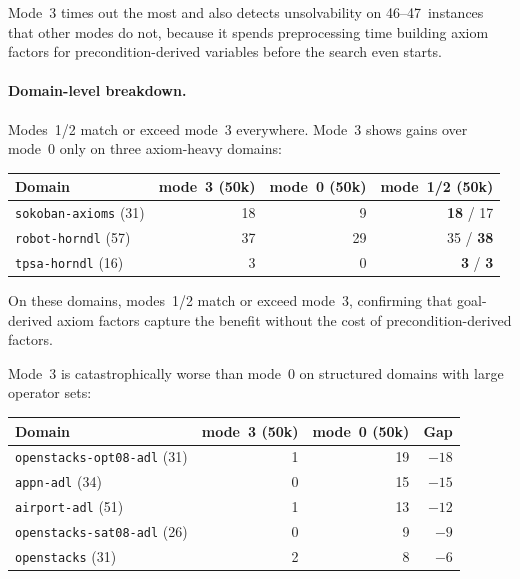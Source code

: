 \documentclass[11pt,a4paper]{article}
\begin{document}
Mode~3 times out the most and also detects unsolvability on 46--47~instances
that other modes do not, because it spends preprocessing time building axiom
factors for precondition-derived variables before the search even starts.

\paragraph{Domain-level breakdown.}

Modes~1/2 match or exceed mode~3 everywhere.  Mode~3 shows gains over mode~0
only on three axiom-heavy domains:

\begin{center}
\small
\begin{tabular}{lrrr}
\toprule
\textbf{Domain} & \textbf{mode~3 (50k)} & \textbf{mode~0 (50k)} & \textbf{mode~1/2 (50k)} \\
\midrule
\texttt{sokoban-axioms} (31) & 18 & 9  & \textbf{18} / 17 \\
\texttt{robot-horndl}   (57) & 37 & 29 & 35 / \textbf{38} \\
\texttt{tpsa-horndl}    (16) & 3  & 0  & \textbf{3} / \textbf{3}  \\
\bottomrule
\end{tabular}
\end{center}

On these domains, modes~1/2 match or exceed mode~3, confirming that
goal-derived axiom factors capture the benefit without the cost of
precondition-derived factors.

Mode~3 is catastrophically worse than mode~0 on structured domains with
large operator sets:

\begin{center}
\small
\begin{tabular}{lrrr}
\toprule
\textbf{Domain} & \textbf{mode~3 (50k)} & \textbf{mode~0 (50k)} & \textbf{Gap} \\
\midrule
\texttt{openstacks-opt08-adl} (31) & 1  & 19 & $-18$ \\
\texttt{appn-adl}             (34) & 0  & 15 & $-15$ \\
\texttt{airport-adl}          (51) & 1  & 13 & $-12$ \\
\texttt{openstacks-sat08-adl} (26) & 0  & 9  & $-9$  \\
\texttt{openstacks}           (31) & 2  & 8  & $-6$  \\
\bottomrule
\end{tabular}
\end{center}
\end{document}
